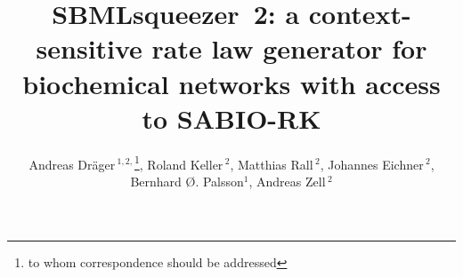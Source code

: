 \documentclass{bioinfo}
\begin{document}

\title[SBMLsqueezer~2]{SBMLsqueezer~2: a context-sensitive rate law generator for biochemical networks with access to SABIO-RK}
\author[A.~Dr\"ager et~al.]{%
Andreas Dr\"ager\,$^{1,2,}$\footnote{to whom correspondence should be
addressed}\hspace{.3em},
Roland Keller\,$^{2}$,
Matthias Rall\,$^{2}$,
Johannes Eichner\,$^{2}$,
Bernhard \O. Palsson$^{1}$,
Andreas Zell\,$^{2}$}
\address{$^{1}$Systems Biology Research Group, University of California, San Diego, La Jolla, CA, United States
$^{2}$Center for Bioinformatics Tuebingen (ZBIT), University of Tuebingen, T\"ubingen, Germany}


\maketitle
\end{document}

